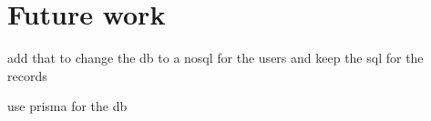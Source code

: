 \chapter{Future work}\label{ch:future_work}


add that to change the db to a nosql for the users and keep the sql for the records

use prisma for the db
